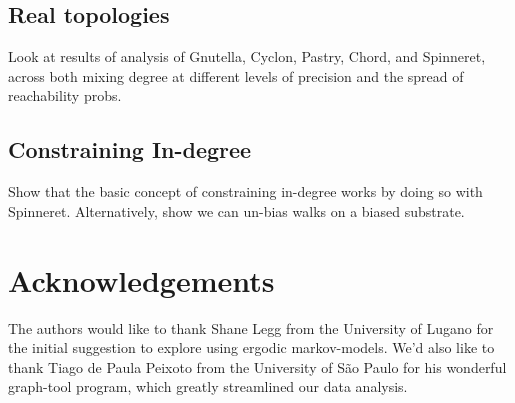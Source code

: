 \documentclass[a4paper,11pt,twocolumn]{article}
\begin{document}
\subsection{Real topologies}

Look at results of analysis of Gnutella, Cyclon, Pastry, Chord, and Spinneret,
across both mixing degree at different levels of precision and the spread of
reachability probs.

\subsection{Constraining In-degree}

Show that the basic concept of constraining in-degree works by doing so with
Spinneret.  Alternatively, show we can un-bias walks on a biased substrate.

\section*{Acknowledgements}
The authors would like to thank Shane Legg from the University of Lugano for
the initial suggestion to explore using ergodic markov-models.  We'd also like
to thank Tiago de Paula Peixoto from the University of S\~ao Paulo for his
wonderful graph-tool program, which greatly streamlined our data analysis.

%
%
\end{document}
